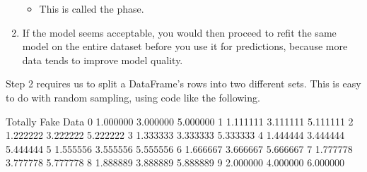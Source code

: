 \documentclass[letterpaper,10pt,english]{jupyterBook}
\begin{document}
\begin{enumerate}
\begin{itemize}
\item {} 
\sphinxAtStartPar
This is called the  phase.

\end{itemize}

\item {} 
\sphinxAtStartPar
If the model seems acceptable, you would then proceed to re\sphinxhyphen{}fit the same model on the entire dataset  before you use it for predictions, because more data tends to improve model quality.

\end{enumerate}

\sphinxAtStartPar
Step 2 requires us to split a DataFrame’s rows into two different sets.  This is easy to do with random sampling, using code like the following.

\begin{sphinxVerbatim}[commandchars=\\\{\}]
   
   
           
\end{sphinxVerbatim}

\begin{sphinxVerbatim}[commandchars=\\\{\}]
    Totally      Fake      Data
0  1.000000  3.000000  5.000000
1  1.111111  3.111111  5.111111
2  1.222222  3.222222  5.222222
3  1.333333  3.333333  5.333333
4  1.444444  3.444444  5.444444
5  1.555556  3.555556  5.555556
6  1.666667  3.666667  5.666667
7  1.777778  3.777778  5.777778
8  1.888889  3.888889  5.888889
9  2.000000  4.000000  6.000000
\end{sphinxVerbatim}
\end{document}
